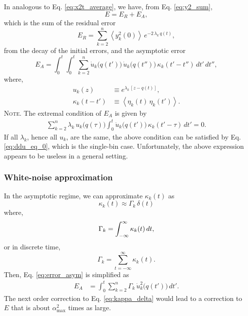 \documentclass[reprint]{revtex4-1}
\newcommand{\note}[1]{{\color{DarkGreen}\footnotesize \textsc{Note.} #1}}
\newcommand{\Err}{E}
\begin{document}
In analogous to Eq. \eqref{eq:x2t_average},
we have, from Eq. \eqref{eq:y2_sum},
%
\begin{equation}
  \Err
  =
  \Err_R + \Err_A,
  \label{eq:error_split}
\end{equation}
%
which is the sum of the residual error
%
\begin{equation}
  \Err_R
  =
  \sum_{k = 2}^n
    \left\langle y_k^2(0) \right\rangle \,
    e^{ - 2 \, \lambda_k  \, q(t) },
  \label{eq:error_res}
\end{equation}
%
from the decay of the initial errors,
and the asymptotic error
\begin{equation}
  \Err_A
  =
  \int_0^t \int_0^t
  \sum_{k = 2}^n
    \dot u_k\bigl( q(t') \bigr) \,
    \dot u_k\bigl( q(t'') \bigr) \,
    \kappa_k(t' - t'') \, dt' \, dt'',
  \label{eq:error_asym}
\end{equation}
%
where,
\begin{align*}
  u_k(z)
  &\equiv
  e^{\lambda_k \, [z - q(t)]},
  \\
  \kappa_k(t - t')
  &\equiv
  \left\langle
    \eta_k(t) \, \eta_k(t')
  \right\rangle.
\end{align*}
%
\note{The extremal condition of $\Err_A$ is given by
%
\begin{align}
\sum_{k = 2}^n
\lambda_k \, u_k\bigl( q(\tau) \bigr)
\int_0^t
\ddot u_k \bigl( q(t') \bigr) \, \kappa_k(t' - \tau) \, dt' = 0.
\label{eq:optimal_mbin}
\end{align}
%
If all $\lambda_k$, hence all $u_k$, are the same,
the above condition can be satisfied
by Eq. \eqref{eq:ddu_eq_0},
which is the single-bin case.
%
Unfortunately, the above expression
appears to be useless in a general setting.
}



\subsubsection{White-noise approximation}



In the asymptotic regime,
we can approximate $\kappa_k(t)$ as
%
\begin{equation}
  \kappa_k(t) \approx \Gamma_k \, \delta(t)
  \label{eq:kappa_delta}
\end{equation}
%
where,
\begin{equation}
  \Gamma_k = \int_{-\infty}^\infty \kappa_k(t) \, dt,
  \notag
\end{equation}
or in discrete time,
\begin{equation}
  \Gamma_k = \sum_{t = -\infty}^\infty \kappa_k(t).
  \label{eq:Gamma_sum}
\end{equation}
%
Then, Eq. \eqref{eq:error_asym} is simplified as
%
\begin{align}
  \Err_A
  &=
  \int_0^t
  \sum_{k = 2}^n
  \Gamma_k \, \dot u_k^2\bigl( q(t') \bigr) \, dt'.
  \label{eq:error_asym1}
\end{align}
%
The next order correction to Eq. \eqref{eq:kappa_delta}
would lead to a correction to $\Err$
that is about $\alpha_{\max}^2$ times as large.
\end{document}
